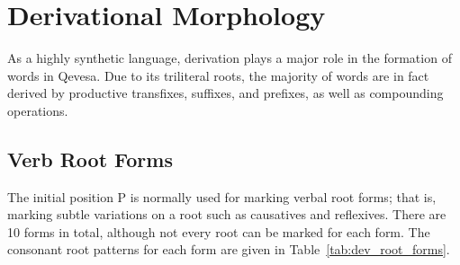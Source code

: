 \documentclass[grammar]{subfiles}
\begin{document}
	\chapter{Derivational Morphology}
	\label{ch:derivational-morphology}

	As a highly synthetic language, derivation plays a major role in the formation of words in Qevesa. Due to its triliteral roots, the majority of words are in fact derived by productive transfixes, suffixes, and prefixes, as well as compounding operations.

	\section{Verb Root Forms}
	\label{sec:dev_verb_root_forms}

	The initial position P is normally used for marking verbal root forms; that is, marking subtle variations on a root such as causatives and reflexives. There are 10 forms in total, although not every root can be marked for each form. The consonant root patterns for each form are given in Table~\ref{tab:dev_root_forms}.

\end{document}
